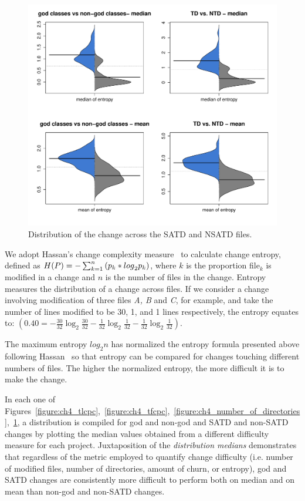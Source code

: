 \begin{figure}[!tb]
	\centering
	\includegraphics[width=120mm]{figures/chapter4/rq3_distribution_of_entropy}
	\caption{Distribution of the change across the SATD and NSATD files.}
	\label{figure:ch4_mtdocatdf}
\end{figure}



We adopt Hassan's change complexity measure~\cite{hassan2009predicting} to calculate change entropy, defined as $H(P)=-\sum _{k=1}^{n}\textrm ({p}_{k}*{log}_{2} {p}_{k})$, where $k$ is the proportion file$_{k}$ is modified in a change and $n$ is the number of files in the change. Entropy measures the distribution of a change across files. If we consider a change involving modification of three files \textit{A, B} and \textit{C}, for example, and take the number of lines modified to be 30, 1, and 1 lines respectively, the entropy equates to: $(0.40=-\frac{30}{32}\log_{2}\frac{30}{32}-\frac{1}{32}\log_{2}\frac{1}{32}-\frac{1}{32}\log_{2}\frac{1}{32})$.

The maximum entropy $log_{2}n$ has normalized the entropy formula presented above following Hassan~\cite{hassan2009predicting} so that entropy can be compared for changes touching different numbers of files. The higher the normalized entropy, the more difficult it is to make the change.\\



In each one of Figures~\ref{figure:ch4_tlcpc},~\ref{figure:ch4_tfcpc},~\ref{figure:ch4_number_of_directories},~\ref{figure:ch4_mtdocatdf}, a distribution is compiled for god and non-god and SATD and non-SATD changes by plotting the median values obtained from a different difficulty measure for each project. Juxtaposition of the \textit{distribution medians} demonstrates that regardless of the metric employed to quantify change difficulty (i.e. number of modified files, number of directories, amount of churn, or entropy), god and SATD changes are consistently more difficult to perform both on median and on mean than non-god and non-SATD changes.

